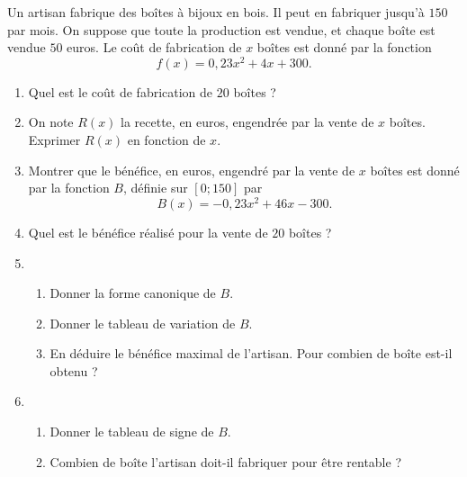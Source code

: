 \documentclass[11pt]{article}
\begin{document}
\newpage
\begin{exo}[$9$ points]
  Un artisan fabrique des boîtes à bijoux en bois. Il peut en fabriquer jusqu'à
  $150$ par mois. On suppose que toute la production est vendue, et chaque boîte
  est vendue $50$ euros. Le coût de fabrication de $x$ boîtes est donné par la
  fonction 
  \[
    f(x) = 0,23x^2+4x+300.
  \]
  \begin{enumerate}
    \item Quel est le coût de fabrication de $20$ boîtes ?
    \item On note $R(x)$ la recette, en euros, engendrée par la vente de $x$
      boîtes. Exprimer $R(x)$ en fonction de $x$.
    \item Montrer que le bénéfice, en euros, engendré par la vente de $x$ boîtes
      est donné par la fonction $B$, définie sur $[0;150]$ par
      \[
        B(x) = -0,23x^2+46x-300.
      \]
    \item Quel est le bénéfice réalisé pour la vente de $20$ boîtes ?
    \item \begin{enumerate}
        \item Donner la forme canonique de $B$.
        \item Donner le tableau de variation de $B$.
        \item En déduire le bénéfice maximal de l'artisan. Pour combien de boîte
          est-il obtenu ?
      \end{enumerate}
    \item \begin{enumerate}
        \item Donner le tableau de signe de $B$.
        \item Combien de boîte l'artisan doit-il fabriquer pour être rentable ?
      \end{enumerate}
  \end{enumerate}
\end{exo}
\end{document}
